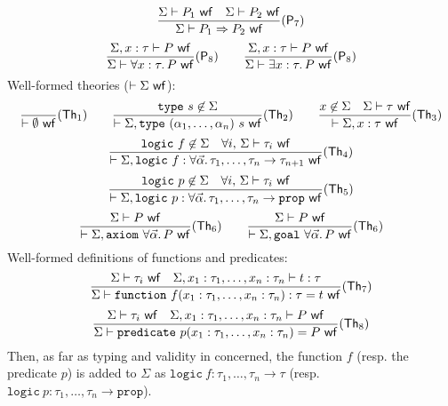 \documentclass[a4paper,12pt]{report}
\begin{document}
\begin{displaymath}
  \frac{\Sigma\vdash P_1~\mathsf{wf} \quad \Sigma\vdash P_2~\mathsf{wf}}
       {\Sigma\vdash P_1\Rightarrow P_2~\mathsf{wf}}(\mathsf{P}_7)
\end{displaymath}
\begin{displaymath}
  \frac{\Sigma,x:\tau\vdash P~\mathsf{wf}}
       {\Sigma\vdash\forall x:\tau.\,P~\mathsf{wf}}(\mathsf{P}_8)
  \qquad
  \frac{\Sigma,x:\tau\vdash P~\mathsf{wf}}
       {\Sigma\vdash\exists x:\tau.\,P~\mathsf{wf}}(\mathsf{P}_8)
\end{displaymath}
Well-formed theories ($\vdash\Sigma~\mathsf{wf}$):
\begin{displaymath}
  \frac{}{\vdash\emptyset~\mathsf{wf}}(\textsf{Th}_1)
  \qquad
  \frac{\texttt{type}~s\not\in\Sigma}
       {\vdash\Sigma,\texttt{type}~(\alpha_1,\dots,\alpha_n)~s~\mathsf{wf}}(\textsf{Th}_2)
  \qquad
  \frac{x\not\in\Sigma \quad \Sigma\vdash\tau~\mathsf{wf}}
       {\vdash\Sigma,x:\tau~\mathsf{wf}}(\textsf{Th}_3)
\end{displaymath}
\begin{displaymath}
  \frac{\texttt{logic}~f\not\in\Sigma \quad
        \forall i,\, \Sigma\vdash\tau_i~\mathsf{wf}}
       {\vdash\Sigma,\mathtt{logic}~f:\forall\vec{\alpha}.\,\tau_1,\dots,\tau_n\rightarrow\tau_{n+1}~\mathsf{wf}}(\textsf{Th}_4)
\end{displaymath}
\begin{displaymath}
  \frac{\texttt{logic}~p\not\in\Sigma \quad
        \forall i,\, \Sigma\vdash\tau_i~\mathsf{wf}}
       {\vdash\Sigma,\mathtt{logic}~p:\forall\vec{\alpha}.\,\tau_1,\dots,\tau_n\rightarrow\mathtt{prop}~\mathsf{wf}}(\textsf{Th}_5)
\end{displaymath}
\begin{displaymath}
  \frac{\Sigma\vdash P~\mathsf{wf}}
       {\vdash\Sigma,\texttt{axiom}~\forall\vec{\alpha}.\,P~\mathsf{wf}}(\textsf{Th}_6)  \qquad
  \frac{\Sigma\vdash P~\mathsf{wf}}
       {\vdash\Sigma,\texttt{goal}~\forall\vec{\alpha}.\,P~\mathsf{wf}}(\textsf{Th}_6)  
\end{displaymath}
Well-formed definitions of functions and predicates:
\begin{displaymath}
  \frac{\Sigma\vdash\tau_i~\mathsf{wf} \quad
        \Sigma,x_1:\tau_1,\dots,x_n:\tau_n\vdash t:\tau}
       {\Sigma\vdash\mathtt{function}~f(x_1:\tau_1,\dots,x_n:\tau_n) : \tau = t~\mathsf{wf}}(\textsf{Th}_7)
\end{displaymath}
\begin{displaymath}
  \frac{\Sigma\vdash\tau_i~\mathsf{wf} \quad
        \Sigma,x_1:\tau_1,\dots,x_n:\tau_n\vdash P~\mathsf{wf}}
       {\Sigma\vdash\mathtt{predicate}~p(x_1:\tau_1,\dots,x_n:\tau_n) = P~\mathsf{wf}}(\textsf{Th}_8)
\end{displaymath}
Then, as far as typing and validity in concerned, the function $f$
(resp. the predicate $p$) is added to $\Sigma$ as 
$\mathtt{logic}~f:\tau_1,\dots,\tau_n\rightarrow\tau$
(resp. $\mathtt{logic}~p:\tau_1,\dots,\tau_n\rightarrow\mathtt{prop}$).
\end{document}
